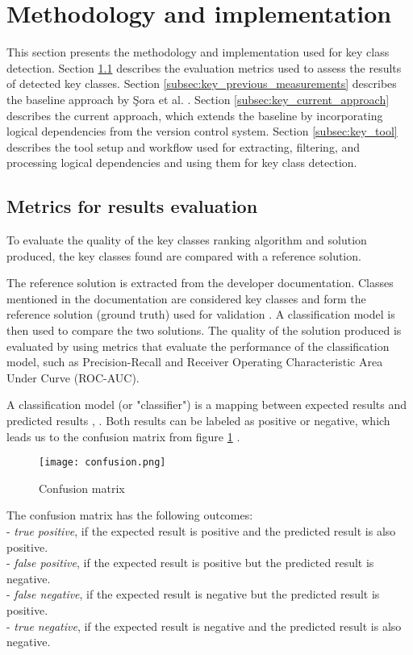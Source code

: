 \section{Methodology and implementation}
\label{sec:key_methodology_implementation}

\hspace{4em}This section presents the methodology and implementation used for key class detection. Section \ref{subsec:key_evalmetrics} describes the evaluation metrics used to assess the results of detected key classes. Section \ref{subsec:key_previous_measurements} describes the baseline approach by Şora et al. \cite{Finding-key-classes}. Section \ref{subsec:key_current_approach} describes the current approach, which extends the baseline by incorporating logical dependencies from the version control system. Section \ref{subsec:key_tool} describes the tool setup and workflow used for extracting, filtering, and processing logical dependencies and using them for key class detection.


\subsection{Metrics for results evaluation} %
\label{subsec:key_evalmetrics}

\hspace{4em}To evaluate the quality of the key classes ranking algorithm and solution produced, the key classes found are compared with a reference solution.

The reference solution is extracted from the developer documentation. Classes mentioned in the documentation are considered key classes and form the reference solution (ground truth) used for validation \cite{7551990}. A classification model is then used to compare the two solutions. The quality of the solution produced is evaluated by using metrics that evaluate the performance of the classification model, such as Precision-Recall and Receiver Operating Characteristic Area Under Curve (ROC-AUC). 

A classification model (or "classifier") is a mapping between expected results and predicted results \cite{ROCIntro}, \cite{ROCBRADLEY19971145}. Both results can be labeled as positive or negative, which leads us to the confusion matrix from figure \ref{fig:confusion} \cite{b4}. 
\begin{figure}[h]
\centering
\texttt{[image: confusion.png]}
\caption{Confusion matrix}
\label{fig:confusion}
\centering
\end{figure}
The confusion matrix has the following outcomes:\\
- \textit{true positive}, if the expected result is positive and the predicted result is also positive.\\
- \textit{false positive}, if the expected result is positive but the predicted result is negative.\\
- \textit{false negative}, if the expected result is negative but the predicted result is positive.\\
- \textit{true negative}, if the expected result is negative and the predicted result is also negative.



